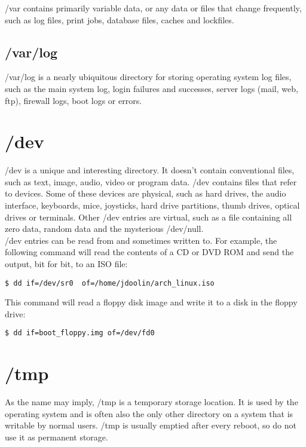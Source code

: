 /var contains primarily variable data, or any data or files that change frequently, such as log files, print jobs, database files, caches and lockfiles.

\subsection{/var/log}

/var/log is a nearly ubiquitous directory for storing operating system log files, such as the main system log, login failures and successes, server logs (mail, web, ftp), firewall logs, boot logs or errors.

\section{/dev}

/dev is a unique and interesting directory.  It doesn't contain conventional files, such as text, image, audio, video or program data.  /dev contains files that refer to devices.  Some of these devices are physical, such as hard drives, the audio interface, keyboards, mice, joysticks, hard drive partitions, thumb drives, optical drives or terminals.  Other /dev entries are virtual, such as a file containing all zero data, random data and the mysterious /dev/null.\\

/dev entries can be read from and sometimes written to.  For example, the following command will read the contents of a CD or DVD ROM and send the output, bit for bit, to an ISO file:

\begin{verbatim}
$ dd if=/dev/sr0  of=/home/jdoolin/arch_linux.iso
\end{verbatim}

This command will read a floppy disk image and write it to a disk in the floppy drive:

\begin{verbatim}
$ dd if=boot_floppy.img of=/dev/fd0
\end{verbatim}

\section{/tmp}

As the name may imply, /tmp is a temporary storage location.  It is used by the operating system and is often also the only other directory on a system that is writable by normal users.  /tmp is usually emptied after every reboot, so do not use it as permanent storage.

